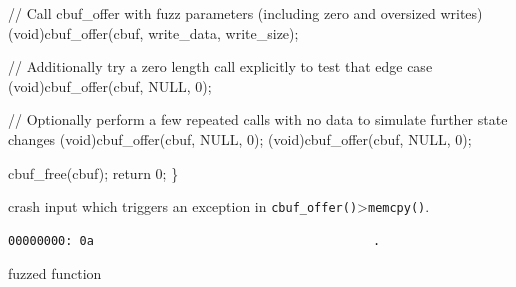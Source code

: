 \documentclass[
  a4paper,
]{scrreprt}
\newenvironment{Shaded}{\begin{snugshade}}{\end{snugshade}}
\newcommand{\CommentTok}[1]{\textcolor[rgb]{0.41,0.41,0.41}{#1}}
\newcommand{\ControlFlowTok}[1]{\textcolor[rgb]{0.85,0.12,0.09}{#1}}
\newcommand{\DataTypeTok}[1]{\textcolor[rgb]{0.47,0.16,0.63}{#1}}
\newcommand{\DecValTok}[1]{\textcolor[rgb]{0.47,0.16,0.63}{#1}}
\newcommand{\NormalTok}[1]{\textcolor[rgb]{0.33,0.33,0.33}{#1}}
\newcommand{\OperatorTok}[1]{\textcolor[rgb]{0.00,0.46,0.62}{#1}}
\theoremstyle{definition}
\theoremstyle{remark}
\begin{document}
\begin{Shaded}
\begin{Highlighting}[numbers=left,,]
    \CommentTok{// Call cbuf\_offer with fuzz parameters (including zero and oversized writes)}
    \OperatorTok{(}\DataTypeTok{void}\OperatorTok{)}\NormalTok{cbuf\_offer}\OperatorTok{(}\NormalTok{cbuf}\OperatorTok{,}\NormalTok{ write\_data}\OperatorTok{,}\NormalTok{ write\_size}\OperatorTok{);}

    \CommentTok{// Additionally try a zero length call explicitly to test that edge case}
    \OperatorTok{(}\DataTypeTok{void}\OperatorTok{)}\NormalTok{cbuf\_offer}\OperatorTok{(}\NormalTok{cbuf}\OperatorTok{,}\NormalTok{ NULL}\OperatorTok{,} \DecValTok{0}\OperatorTok{);}

    \CommentTok{// Optionally perform a few repeated calls with no data to simulate further state changes}
    \OperatorTok{(}\DataTypeTok{void}\OperatorTok{)}\NormalTok{cbuf\_offer}\OperatorTok{(}\NormalTok{cbuf}\OperatorTok{,}\NormalTok{ NULL}\OperatorTok{,} \DecValTok{0}\OperatorTok{);}
    \OperatorTok{(}\DataTypeTok{void}\OperatorTok{)}\NormalTok{cbuf\_offer}\OperatorTok{(}\NormalTok{cbuf}\OperatorTok{,}\NormalTok{ NULL}\OperatorTok{,} \DecValTok{0}\OperatorTok{);}

\NormalTok{    cbuf\_free}\OperatorTok{(}\NormalTok{cbuf}\OperatorTok{);}
    \ControlFlowTok{return} \DecValTok{0}\OperatorTok{;}
\OperatorTok{\}}
\end{Highlighting}
\end{Shaded}

crash input which triggers an exception in
\texttt{cbuf\_offer()}\textgreater{}\texttt{memcpy()}.

\begin{verbatim}
00000000: 0a                                       .
\end{verbatim}

fuzzed function
\end{document}
